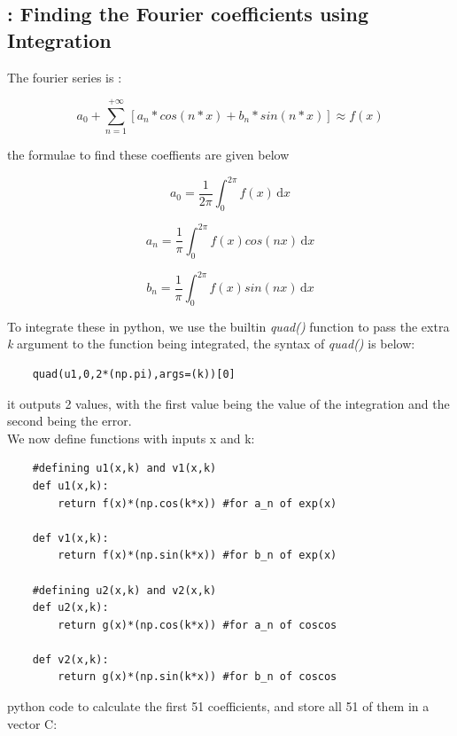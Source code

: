 \documentclass[11pt]{article}
\begin{document}
\subsection{: Finding the Fourier coefficients using Integration}
The fourier series is :

\begin{equation}
    a_0 + \sum_{n=1}^{+\infty} [a_n*cos(n*x) + b_n*sin(n*x)] \approx f(x)
\end{equation}

the formulae to find these coeffients are given below

\begin{equation}
    a_0 = \frac{1}{2\pi} \int_0^{2\pi}f(x)\,\mathrm{d}x
\end{equation}

\begin{equation}
    a_n = \frac{1}{\pi} \int_0^{2\pi}f(x)cos(nx)\,\mathrm{d}x
\end{equation}

\begin{equation}
    b_n = \frac{1}{\pi} \int_0^{2\pi}f(x)sin(nx)\,\mathrm{d}x
\end{equation}

To integrate these in python, we use the builtin \textit{quad()} function to pass the extra \textit{k} argument to the function being integrated,
the syntax of \textit{quad()} is below:
\begin{verbatim}
    quad(u1,0,2*(np.pi),args=(k))[0]
\end{verbatim}

it outputs 2 values, with the first value being the value of the integration and the second being the error.\\
We now define functions with inputs x and k:
\begin{verbatim}
    #defining u1(x,k) and v1(x,k)
    def u1(x,k):
    	return f(x)*(np.cos(k*x)) #for a_n of exp(x)
    
    def v1(x,k):
    	return f(x)*(np.sin(k*x)) #for b_n of exp(x)
    
    #defining u2(x,k) and v2(x,k)
    def u2(x,k):
    	return g(x)*(np.cos(k*x)) #for a_n of coscos
    
    def v2(x,k):
    	return g(x)*(np.sin(k*x)) #for b_n of coscos

\end{verbatim}

\noindent python code to calculate the first 51 coefficients, and store all 51 of them in a vector C:
\end{document}
